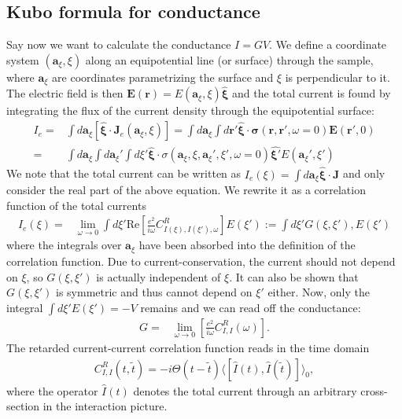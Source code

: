 \documentclass[english]{scrartcl}
\newcommand{\mr}{\mathrm}
\begin{document}
\subsection{Kubo formula for conductance}
Say now we want to calculate the conductance $I = G V$. We define a coordinate system $(\bm a_\xi, \xi)$ along an equipotential line (or surface) through the sample, where $\bm a_\xi$ are coordinates parametrizing the surface and $\xi$ is perpendicular to it. The electric field is then $\bm E(\bm r) = E(\bm a_\xi, \xi) \hat {\bm \xi}$ and the total current is found by integrating the flux of the current density through the equipotential surface:
\begin{align*}
I_e =& \int d {\bm a_\xi} \left[ \hat {\bm \xi} \cdot \bm J_e (\bm a_\xi, \xi) \right] = \int d {\bm a_\xi} \int d \bm r'  \hat {\bm \xi} \cdot \bm \sigma (\bm r , \bm r', \omega = 0) \bm E (\bm r', 0) \\
=&\int d {\bm a_\xi} \int d {\bm a_\xi'} \int d \xi'  \hat {\bm \xi} \cdot \sigma (\bm a_\xi, \xi, \bm a_\xi', \xi', \omega = 0)  \hat {\bm \xi'} E(\bm a_\xi', \xi')
\end{align*}
We note that the total current can be written as $I_e(\xi) = \int d \bm a_\xi \hat {\bm \xi} \cdot \bm J$ and only consider the real part of the above equation. We rewrite it as a correlation function of the total currents
\begin{align*}
I_e(\xi)=& \lim_{\omega \to 0}\int d \xi' \mr{Re} \left[ \frac{e^2}{i \omega} C_{I(\xi), I(\xi'), \omega}^R \right] E(\xi') := \int d \xi'  G(\xi, \xi'), E(\xi')
\end{align*}
where the integrals over $\bm a_\xi$ have been absorbed into the definition of the correlation function. Due to current-conservation, the current should not depend on $\xi$, so $G(\xi, \xi')$ is actually independent of $\xi$. It can also be shown that $G(\xi, \xi')$ is symmetric and thus cannot depend on $\xi'$ either. Now, only the integral $\int d \xi' E(\xi') = - V$ remains and we can read off the conductance:
\begin{align*}
G =& \lim_{\omega \to 0} \left[\frac{e^2}{i \omega} C_{I, I}^R (\omega) \right].
\end{align*}
The retarded current-current correlation function reads in the time domain
\begin{align*}
C_{I, I}^R (t, \tilde t) = -i \Theta (t - \tilde t) \langle \left[\hat I (t), \hat  I (\tilde t) \right ] \rangle_0,
\end{align*}
where the operator $\hat I (t)$ denotes the total current through an arbitrary cross-section in the interaction picture.
\end{document}
